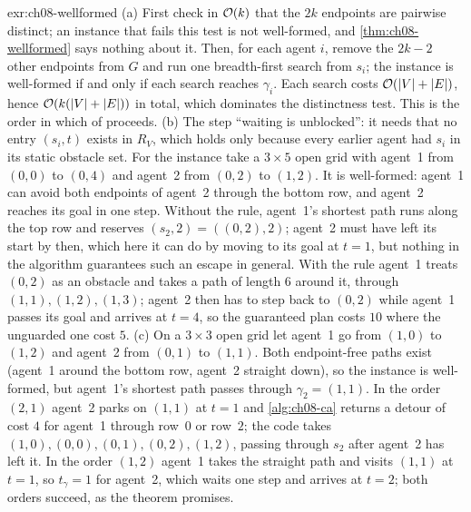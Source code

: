 \begin{solution}{exr:ch08-wellformed}
(a) First check in $\mathcal{O}\!\left(k\right)$ that the $2k$ endpoints are pairwise distinct; an instance that fails this test is not well-formed, and \cref{thm:ch08-wellformed} says nothing about it. Then, for each agent $i$, remove the $2k - 2$ other endpoints from $G$ and run one breadth-first search from $s_i$; the instance is well-formed if and only if each search reaches $\gamma_i$. Each search costs $\mathcal{O}\!\left(\left\lvert V \right\rvert + \left\lvert E \right\rvert\right)$, hence $\mathcal{O}\!\left(k(\left\lvert V \right\rvert + \left\lvert E \right\rvert)\right)$ in total, which dominates the distinctness test. This is the order in which  of  proceeds. (b) The step ``waiting is unblocked'': it needs that no entry $(s_i, t)$ exists in $R_V$, which holds only because every earlier agent had $s_i$ in its static obstacle set. For the instance take a $3 \times 5$ open grid with agent~1 from $(0,0)$ to $(0,4)$ and agent~2 from $(0,2)$ to $(1,2)$. It is well-formed: agent~1 can avoid both endpoints of agent~2 through the bottom row, and agent~2 reaches its goal in one step. Without the rule, agent~1's shortest path runs along the top row and reserves $(s_2, 2) = ((0,2), 2)$; agent~2 must have left its start by then, which here it can do by moving to its goal at $t = 1$, but nothing in the algorithm guarantees such an escape in general. With the rule agent~1 treats $(0,2)$ as an obstacle and takes a path of length $6$ around it, through $(1,1), (1,2), (1,3)$; agent~2 then has to step back to $(0,2)$ while agent~1 passes its goal and arrives at $t = 4$, so the guaranteed plan costs $10$ where the unguarded one cost $5$. (c) On a $3 \times 3$ open grid let agent~1 go from $(1,0)$ to $(1,2)$ and agent~2 from $(0,1)$ to $(1,1)$. Both endpoint-free paths exist (agent~1 around the bottom row, agent~2 straight down), so the instance is well-formed, but agent~1's shortest path passes through $\gamma_2 = (1,1)$. In the order $(2,1)$ agent~2 parks on $(1,1)$ at $t = 1$ and \cref{alg:ch08-ca} returns a detour of cost $4$ for agent~1 through row~$0$ or row~$2$; the code takes $(1,0), (0,0), (0,1), (0,2), (1,2)$, passing through $s_2$ after agent~2 has left it. In the order $(1,2)$ agent~1 takes the straight path and visits $(1,1)$ at $t = 1$, so $t_\gamma = 1$ for agent~2, which waits one step and arrives at $t = 2$; both orders succeed, as the theorem promises.
\end{solution}

